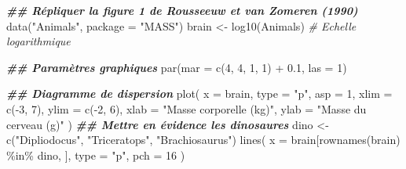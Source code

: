 \documentclass[
  french,
]{scrbook}
\newenvironment{Shaded}{\begin{snugshade}}{\end{snugshade}}
\newcommand{\AttributeTok}[1]{\textcolor[rgb]{0.77,0.63,0.00}{#1}}
\newcommand{\CommentTok}[1]{\textcolor[rgb]{0.56,0.35,0.01}{\textit{#1}}}
\newcommand{\DecValTok}[1]{\textcolor[rgb]{0.00,0.00,0.81}{#1}}
\newcommand{\DocumentationTok}[1]{\textcolor[rgb]{0.56,0.35,0.01}{\textbf{\textit{#1}}}}
\newcommand{\FloatTok}[1]{\textcolor[rgb]{0.00,0.00,0.81}{#1}}
\newcommand{\FunctionTok}[1]{\textcolor[rgb]{0.00,0.00,0.00}{#1}}
\newcommand{\NormalTok}[1]{#1}
\newcommand{\OtherTok}[1]{\textcolor[rgb]{0.56,0.35,0.01}{#1}}
\newcommand{\SpecialCharTok}[1]{\textcolor[rgb]{0.00,0.00,0.00}{#1}}
\newcommand{\StringTok}[1]{\textcolor[rgb]{0.31,0.60,0.02}{#1}}
\begin{document}
\begin{Shaded}
\begin{Highlighting}[]
\DocumentationTok{\#\# Répliquer la figure 1 de Rousseeuw et van Zomeren (1990)}
\FunctionTok{data}\NormalTok{(}\StringTok{"Animals"}\NormalTok{, }\AttributeTok{package =} \StringTok{"MASS"}\NormalTok{)}
\NormalTok{brain }\OtherTok{\textless{}{-}} \FunctionTok{log10}\NormalTok{(Animals) }\CommentTok{\# Echelle logarithmique}

\DocumentationTok{\#\# Paramètres graphiques}
\FunctionTok{par}\NormalTok{(}\AttributeTok{mar =} \FunctionTok{c}\NormalTok{(}\DecValTok{4}\NormalTok{, }\DecValTok{4}\NormalTok{, }\DecValTok{1}\NormalTok{, }\DecValTok{1}\NormalTok{) }\SpecialCharTok{+} \FloatTok{0.1}\NormalTok{, }\AttributeTok{las =} \DecValTok{1}\NormalTok{)}

\DocumentationTok{\#\# Diagramme de dispersion}
\FunctionTok{plot}\NormalTok{(}
  \AttributeTok{x =}\NormalTok{ brain, }\AttributeTok{type =} \StringTok{"p"}\NormalTok{, }\AttributeTok{asp =} \DecValTok{1}\NormalTok{,}
  \AttributeTok{xlim =} \FunctionTok{c}\NormalTok{(}\SpecialCharTok{{-}}\DecValTok{3}\NormalTok{, }\DecValTok{7}\NormalTok{), }\AttributeTok{ylim =} \FunctionTok{c}\NormalTok{(}\SpecialCharTok{{-}}\DecValTok{2}\NormalTok{, }\DecValTok{6}\NormalTok{),}
  \AttributeTok{xlab =} \StringTok{"Masse corporelle (kg)"}\NormalTok{,}
  \AttributeTok{ylab =} \StringTok{"Masse du cerveau (g)"}
\NormalTok{)}
\DocumentationTok{\#\# Mettre en évidence les dinosaures}
\NormalTok{dino }\OtherTok{\textless{}{-}} \FunctionTok{c}\NormalTok{(}\StringTok{"Dipliodocus"}\NormalTok{, }\StringTok{"Triceratops"}\NormalTok{, }\StringTok{"Brachiosaurus"}\NormalTok{)}
\FunctionTok{lines}\NormalTok{(}
  \AttributeTok{x =}\NormalTok{ brain[}\FunctionTok{rownames}\NormalTok{(brain) }\SpecialCharTok{\%in\%}\NormalTok{ dino, ],}
  \AttributeTok{type =} \StringTok{"p"}\NormalTok{, }\AttributeTok{pch =} \DecValTok{16}
\NormalTok{)}


\end{Highlighting}
\end{Shaded}
\end{document}
